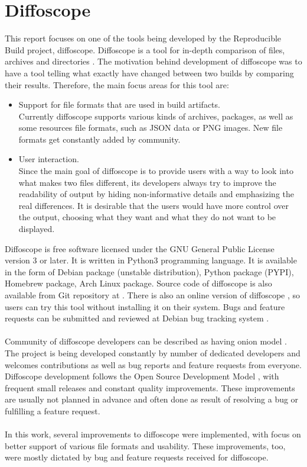 \section{Diffoscope}

This report focuses on one of the tools being developed by the
Reproducible Build project, diffoscope.
Diffoscope is a tool for in-depth comparison of files, archives and
directories \autocite{dfs}.
The motivation behind development of diffoscope was to have a tool
telling what exactly have changed between two builds by comparing
their results. Therefore, the main focus areas for this tool are:
\begin{itemize}
    \item Support for file formats that are used in build artifacts. \\
    Currently diffoscope supports various kinds of archives, packages,
    as well as some resources file formats, such as JSON data or PNG images.
    New file formats get constantly added by community.
    \item User interaction.\\
    Since the main goal of diffoscope is to provide users with a way to look
    into what makes two files different, its developers always try to
    improve the readability of output by hiding non-informative details and
    emphasizing the real differences. It is desirable that the users would
    have more control over the output, choosing what they want and what they
    do not want to be displayed.
\end{itemize}

Diffoscope is free software licensed under the GNU General Public
License version 3 or later. It is written in Python3 programming language.
It is available in the form of Debian package (unstable distribution),
Python package (PYPI), Homebrew package, Arch Linux package. Source code
of diffoscope is also available from Git repository at \autocite{dfs-git}.
There is also an online version of diffoscope \autocite{try-dfs}, so users
can try this tool without installing it on their system.
Bugs and feature requests can be submitted and reviewed at Debian
bug tracking system \autocite{dfs-bugs}.\\\\
Community of diffoscope developers can be described as having
onion model \autocite{aberdour2007achieving}.
The project is being developed constantly by number of dedicated
developers and welcomes contributions as well as bug reports
and feature requests from everyone.
Diffoscope development follows the Open Source Development Model
\autocite{osdm}, with frequent small releases and constant quality improvements.
These improvements are usually not planned in advance and often
done as result of resolving a bug or fulfilling a feature request.\\\\
In this work, several improvements to diffoscope were implemented,
with focus on better support of various file formats and usability.
These improvements, too, were mostly dictated by bug and feature requests
received for diffoscope.



